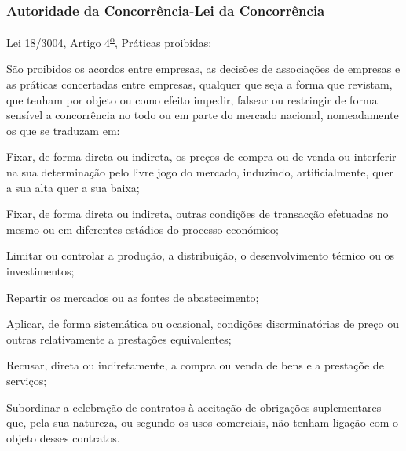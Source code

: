 \begin{frame}
	\frametitle{Autoridade da Concorr\^encia-Lei da Concorr\^encia}
	\footnotesize{Lei 18/3004, Artigo 4\textsuperscript{\underline{o}}, Pr\'aticas proibidas:}
	
	\begin{enumerate}
		{\scriptsize
		\item S\~ao proibidos os acordos entre empresas, as decis\~oes de associa\c c\~oes de empresas e as pr\'aticas concertadas entre empresas, qualquer que seja a forma que revistam, que tenham por objeto ou como efeito impedir, falsear ou restringir de forma sens\'ivel a concorr\^encia no todo ou em parte do mercado nacional, nomeadamente os que se traduzam em:
		\begin{enumerate}[a)]
			{\scriptsize
			\item Fixar, de forma direta ou indireta, os pre\c cos de compra ou de venda ou interferir na sua determina\c c\~ao pelo livre jogo do mercado, induzindo, artificialmente, quer a sua alta quer a sua baixa;
			\item Fixar, de forma direta ou indireta, outras condi\c c\~oes de transac\c c\~ao efetuadas no mesmo ou em diferentes est\'adios do processo econ\'omico;
			\item Limitar ou controlar a produ\c c\~ao, a distribui\c c\~ao, o desenvolvimento t\'ecnico ou os investimentos;
			\item Repartir os mercados ou as fontes de abastecimento;
			\item Aplicar, de forma sistem\'atica ou ocasional, condi\c c\~oes discrminat\'orias de pre\c co ou outras relativamente a presta\c c\~oes equivalentes;
			\item Recusar, direta ou indiretamente, a compra ou venda de bens e a presta\c c\~oe de servi\c cos;
			\item Subordinar a celebra\c c\~ao de contratos \`a aceita\c c\~ao de obriga\c c\~oes suplementares que, pela sua natureza, ou segundo os usos comerciais, n\~ao tenham liga\c c\~ao com o objeto desses contratos.
			}
		\end{enumerate}
		}
	\end{enumerate}
\end{frame}